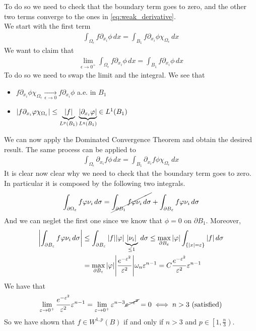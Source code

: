 To do so we need to check that the boundary term goes to zero, and the other two terms converge to the ones in \eqref{eq:weak_derivative}. \\
We start with the first term
\[
    \begin{split}
        \int_{\Omega_\epsilon} f \partial_{x_i} \phi \, dx = \int_{B_1} f \partial_{x_i} \phi \chi_{\Omega_\epsilon} \, dx
    \end{split}
\]
We want to claim that
\[
    \begin{split}
        \lim_{\epsilon \to 0^+} \int_{\Omega_\epsilon} f \partial_{x_i} \phi \, dx = \int_{B_1} f \partial_{x_i} \phi \, dx
    \end{split}
\]
To do so we need to swap the limit and the integral. We see that
\begin{itemize}
    \item \(f \partial_{x_i} \phi \chi_{\Omega_\epsilon} \underset{\epsilon \to 0}{\longrightarrow} f \partial_{x_i} \phi\) a.e. in \(B_1\)
    \item \(\abs{f \partial_{x_i} \phi \chi_{\Omega_\epsilon}} \leq \underbrace{\abs{f}}_{L^p(B_1)} \underbrace{\abs{\partial_{x_i} \phi}}_{L^q(B_1)} \in L^1(B_1)\)
\end{itemize}
We can now apply the Dominated Convergence Theorem and obtain the desired result.
The same process can be applied to
\[
    \begin{split}
        \int_{\Omega_\epsilon} \partial_{x_i} f \phi \, dx = \int_{B_1} \partial_{x_i} f \phi \chi_{\Omega_\epsilon} \, dx
    \end{split}
\]
It is clear now clear why we need to check that the boundary term goes to zero.
In particular it is composed by the following two integrals.
\[
    \begin{split}
        \int_{\partial\Omega_\epsilon} f \phi \nu_i \, d\sigma = \cancel{\int_{\partial B_1} f \phi \nu_i \, d\sigma} + \int_{\partial B_\epsilon} f \phi \nu_i \, d\sigma
    \end{split}
\]
And we can neglet the first one since we know that $\phi = 0$ on $\partial
    B_1$. Moreover,
\[
    \begin{split}
        \abs{\int_{\partial B_\epsilon} f \phi \nu_i \, d\sigma} & \leq \int_{\partial B_\epsilon} \abs{f} \abs{\phi} \underbrace{\abs{\nu_i}}_{\leq 1} \, d\sigma \leq \max_{\partial B_\epsilon} \abs{\phi} \int_{\{ \abs{x} = \epsilon \}} \abs{f} \, d\sigma \\
                                                                 & = \max_{\partial B_\epsilon} \abs{\phi} \abs{\frac{e^{-\epsilon^2}}{\epsilon^2}} \omega_n \epsilon^{n-1} = C \frac{e^{-\epsilon^2}}{\epsilon^2} \epsilon^{n-1}
    \end{split}
\]
We have that
\[
    \begin{split}
        \lim_{\epsilon \to 0^+} \frac{e^{-\epsilon^2}}{\epsilon^2} \epsilon^{n-1} = \lim_{\epsilon \to 0^+} \epsilon^{n-3} \cancel{e^{-\epsilon^2}} = 0 \iff n > 3 \text{ (satisfied)}
    \end{split}
\]
So we have shown that $f \in W^{1, p}(B)$ if and only if $n>3$ and $p \in
    \left[1, \frac{n}{3}\right)$.

